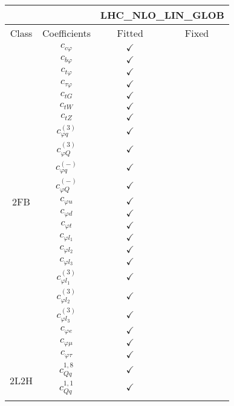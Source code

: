 \documentclass{article}
\begin{document}
\begin{table}[H]
\centering
\begin{tabular}{|c|c|c|c|}
\hline
 &  & \multicolumn{2}{c|}{LHC_NLO_LIN_GLOB} \\ \hline
Class & Coefficients & Fitted & Fixed  \\ \hline
\multirow{23}{*}{2FB}
 & $c_{c \varphi}$ & $\checkmark$ & \\ \cline{2-4}
 & $c_{b \varphi}$ & $\checkmark$ & \\ \cline{2-4}
 & $c_{t \varphi}$ & $\checkmark$ & \\ \cline{2-4}
 & $c_{\tau \varphi}$ & $\checkmark$ & \\ \cline{2-4}
 & $c_{tG}$ & $\checkmark$ & \\ \cline{2-4}
 & $c_{tW}$ & $\checkmark$ & \\ \cline{2-4}
 & $c_{tZ}$ & $\checkmark$ & \\ \cline{2-4}
 & $c_{\varphi q}^{(3)}$ & $\checkmark$ & \\ \cline{2-4}
 & $c_{\varphi Q}^{(3)}$ & $\checkmark$ & \\ \cline{2-4}
 & $c_{\varphi q}^{(-)}$ & $\checkmark$ & \\ \cline{2-4}
 & $c_{\varphi Q}^{(-)}$ & $\checkmark$ & \\ \cline{2-4}
 & $c_{\varphi u}$ & $\checkmark$ & \\ \cline{2-4}
 & $c_{\varphi d}$ & $\checkmark$ & \\ \cline{2-4}
 & $c_{\varphi t}$ & $\checkmark$ & \\ \cline{2-4}
 & $c_{\varphi l_1}$ & $\checkmark$ & \\ \cline{2-4}
 & $c_{\varphi l_2}$ & $\checkmark$ & \\ \cline{2-4}
 & $c_{\varphi l_3}$ & $\checkmark$ & \\ \cline{2-4}
 & $c_{\varphi l_1}^{(3)}$ & $\checkmark$ & \\ \cline{2-4}
 & $c_{\varphi l_2}^{(3)}$ & $\checkmark$ & \\ \cline{2-4}
 & $c_{\varphi l_3}^{(3)}$ & $\checkmark$ & \\ \cline{2-4}
 & $c_{\varphi e}$ & $\checkmark$ & \\ \cline{2-4}
 & $c_{\varphi \mu}$ & $\checkmark$ & \\ \cline{2-4}
 & $c_{\varphi \tau}$ & $\checkmark$ & 
\\ \hline
\multirow{14}{*}{2L2H}
 & $c_{Qq}^{1,8}$ & $\checkmark$ & \\ \cline{2-4}
 & $c_{Qq}^{1,1}$ & $\checkmark$ & \\ \cline{2-4}

\end{tabular}
\end{table}
\end{document}
